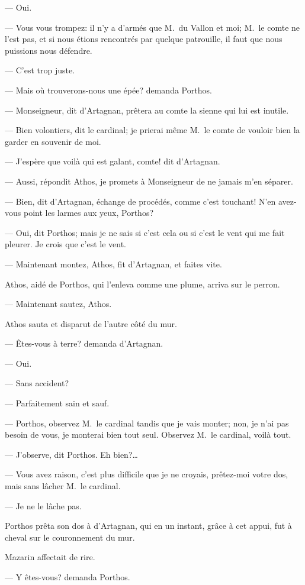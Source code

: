 — Oui.

— Vous vous trompez: il n'y a d'armés que M.~du Vallon et moi; M.~le comte ne l'est pas, et si nous étions rencontrés par quelque patrouille, il faut que nous puissions nous défendre.

— C'est trop juste.

— Mais où trouverons-nous une épée? demanda Porthos.

— Monseigneur, dit d'Artagnan, prêtera au comte la sienne qui lui est inutile.

— Bien volontiers, dit le cardinal; je prierai même M.~le comte de vouloir bien la garder en souvenir de moi.

— J'espère que voilà qui est galant, comte! dit d'Artagnan.

— Aussi, répondit Athos, je promets à Monseigneur de ne jamais m'en séparer.

— Bien, dit d'Artagnan, échange de procédés, comme c'est touchant! N'en avez-vous point les larmes aux yeux, Porthos?

— Oui, dit Porthos; mais je ne sais si c'est cela ou si c'est le vent qui me fait pleurer. Je crois que c'est le vent.

— Maintenant montez, Athos, fit d'Artagnan, et faites vite.

Athos, aidé de Porthos, qui l'enleva comme une plume, arriva sur le perron.

— Maintenant sautez, Athos.

Athos sauta et disparut de l'autre côté du mur.

— Êtes-vous à terre? demanda d'Artagnan.

— Oui.

— Sans accident?

— Parfaitement sain et sauf.

— Porthos, observez M.~le cardinal tandis que je vais monter; non, je n'ai pas besoin de vous, je monterai bien tout seul. Observez M.~le cardinal, voilà tout.

— J'observe, dit Porthos. Eh bien?\dots

— Vous avez raison, c'est plus difficile que je ne croyais, prêtez-moi votre dos, mais sans lâcher M.~le cardinal.

— Je ne le lâche pas.

Porthos prêta son dos à d'Artagnan, qui en un instant, grâce à cet appui, fut à cheval sur le couronnement du mur.

Mazarin affectait de rire.

— Y êtes-vous? demanda Porthos.

